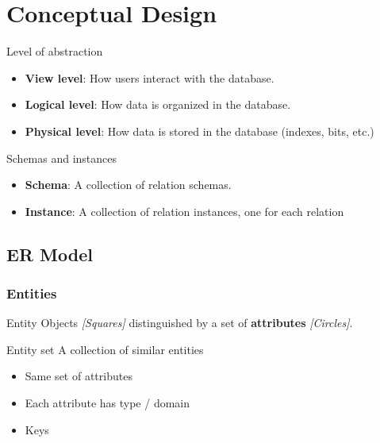\section{Conceptual Design}

\begin{knBox}
    {Level of abstraction}

    \begin{itemize}
        \item \textbf{View level}: How users interact with the database.
        \item \textbf{Logical level}: How data is organized in the database.
        \item \textbf{Physical level}: How data is stored in the database (indexes, bits, etc.)
    \end{itemize}
\end{knBox}

\begin{definition}
    {Schemas and instances}

    \begin{itemize}
        \item \textbf{Schema}: A collection of relation schemas.
        \item \textbf{Instance}: A collection of relation instances, one for each relation
    \end{itemize}
\end{definition}

\subsection{ER Model}

\subsubsection{Entities}

\begin{knBox}
    {Entity}
    Objects \textit{[Squares]} distinguished by a set of \textbf{attributes} \textit{[Circles]}.
\end{knBox}

\begin{knBox}
    {Entity set}
    A collection of similar entities
    \begin{itemize}
        \item Same set of attributes
        \item Each attribute has type / domain
        \item Keys
    \end{itemize}
\end{knBox}

